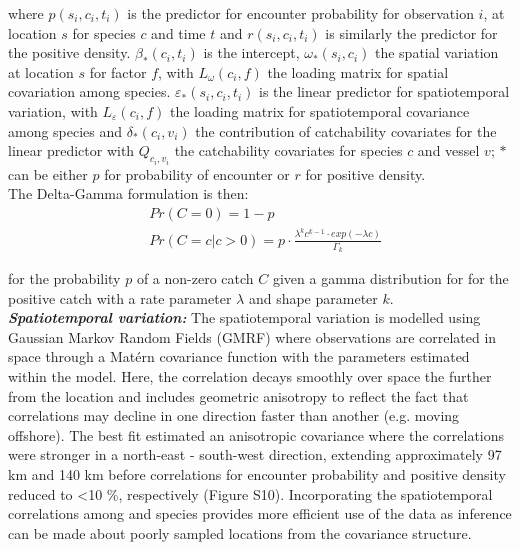 \documentclass[fleqn,10pt]{wlscirep}
\begin{document}
\begin{linenumbers}
where $p(s_{i}, c_{i}, t_{i})$ is the predictor for encounter probability for
observation $i$, at location $s$ for species $c$ and time $t$ and $r(s_{i},
c_{i}, t_{i})$ is similarly the predictor for the positive density.
$\beta_{*}(c_{i},t_{i})$ is the intercept, $\omega_{*}(s_{i},c_{i})$ the
spatial variation at location $s$ for factor $f$, with $L_{\omega}(c_{i},f)$
the loading matrix for spatial covariation among species.
$\varepsilon_{*}(s_{i},c_{i},t_{i})$ is the linear predictor for spatiotemporal
variation, with $L_{\varepsilon}(c_{i}, f)$ the loading matrix for
spatiotemporal covariance among species and $\delta_{*}(c_{i}, v_{i})$ the
contribution of catchability covariates for the linear predictor with
$Q_{c_{i}, v_{i}}$ the catchability covariates for species $c$ and vessel $v$;
$*$ can be either $p$ for probability of encounter or $r$ for positive
density.\\

The Delta-Gamma formulation is then:
\begin{equation}
	\begin{split}
	& Pr(C = 0) = 1 - p \\
	& Pr(C = c | c > 0) = p \cdot \frac{\lambda^{k}c^{k-1} \cdot exp(-\lambda c)}{\Gamma_{k}}
	\end{split}
\end{equation}

for the probability $p$ of a non-zero catch $C$ given a gamma distribution for
for the positive catch with a rate parameter $\lambda$ and shape parameter
$k$.\\

\textbf{\textit{Spatiotemporal variation:}} The spatiotemporal variation is
modelled using Gaussian Markov Random Fields (GMRF) where observations are
correlated in space through a Matérn covariance function with the parameters
estimated within the model. Here, the correlation decays smoothly over space
the further from the location and includes geometric anisotropy to reflect the
fact that correlations may decline in one direction faster than another (e.g.
moving offshore)\cite{Thorson2013}.  The best fit estimated an anisotropic
covariance where the correlations were stronger in a north-east - south-west
direction, extending approximately 97 km and 140 km before correlations for
encounter probability and positive density reduced to \textless 10 \%,
respectively (Figure S10).  Incorporating the spatiotemporal correlations among
and species provides more efficient use of the data as inference can be made
about poorly sampled locations from the covariance structure.\\


\end{linenumbers}
\end{document}
